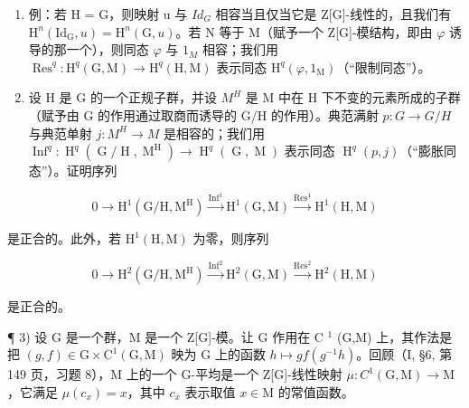 \begin{enumerate}
\def\labelenumi{\alph{enumi})}
\setcounter{enumi}{3}
\item
  例：若 H = G，则映射 u 与 \(Id_{G}\) 相容当且仅当它是 Z{[}G{]}-线性的，且我们有 \(\mathrm{H}^{n}(\mathrm{Id}_{\mathrm{G}}, u) = \mathrm{H}^{n}(\mathrm{G}, u)\)。若 N 等于 M（赋予一个 Z{[}G{]}-模结构，即由 \(\varphi\) 诱导的那一个），则同态 \(\varphi\) 与 \(1_{M}\) 相容；我们用 \(\operatorname{Res}^{q} : \mathrm{H}^{q}(\mathrm{G}, \mathrm{M}) \to \mathrm{H}^{q}(\mathrm{H}, \mathrm{M})\) 表示同态 \(\mathrm{H}^{q}(\varphi, 1_{\mathrm{M}})\)（“限制同态”）。
\item
  设 H 是 G 的一个正规子群，并设 \(M^{H}\) 是 M 中在 H 下不变的元素所成的子群（赋予由 G 的作用通过取商而诱导的 G/H 的作用）。典范满射 \(p: G \rightarrow G/H\) 与典范单射 \(j: M^{H} \rightarrow M\) 是相容的；我们用 \(\operatorname{Inf}^{q}: \operatorname{H}^{q}(\operatorname{G}/\operatorname{H}, \operatorname{M}^{\operatorname{H}}) \to \operatorname{H}^{q}(\operatorname{G}, \operatorname{M})\) 表示同态 \(\operatorname{H}^{q}(p, j)\)（“膨胀同态”）。证明序列
\end{enumerate}

\[
0 \to \mathrm{H} ^ {1} (\mathrm{G} / \mathrm{H}, \mathrm{M} ^ {\mathrm{H}}) \xrightarrow {\operatorname{Inf} ^ {1}} \mathrm{H} ^ {1} (\mathrm{G}, \mathrm{M}) \xrightarrow {\operatorname{Res} ^ {1}} \mathrm{H} ^ {1} (\mathrm{H}, \mathrm{M})
\]

是正合的。此外，若 \(\mathrm{H}^1 (\mathrm{H},\mathrm{M})\) 为零，则序列

\[
0 \to \mathrm{H} ^ {2} (\mathrm{G} / \mathrm{H}, \mathrm{M} ^ {\mathrm{H}}) \xrightarrow {\operatorname{Inf} ^ {2}} \mathrm{H} ^ {2} (\mathrm{G}, \mathrm{M}) \xrightarrow {\operatorname{Res} ^ {2}} \mathrm{H} ^ {2} (\mathrm{H}, \mathrm{M})
\]

是正合的。

¶ 3) 设 G 是一个群，M 是一个 Z{[}G{]}-模。让 G 作用在 C \(^{1}\) (G,M) 上，其作法是把 \((g,f)\in\mathrm{G}\times\mathrm{C}^{1}(\mathrm{G},\mathrm{M})\) 映为 G 上的函数 \(h\mapsto gf(g^{-1}h)\)。回顾（I, §6, 第 149 页，习题 8），M 上的一个 G-平均是一个 Z{[}G{]}-线性映射 \(\mu:C^{1}(\mathrm{G},\mathrm{M})\to\mathrm{M}\)，它满足 \(\mu(c_{x})=x\)，其中 \(c_{x}\) 表示取值 \(x\in\mathrm{M}\) 的常值函数。


